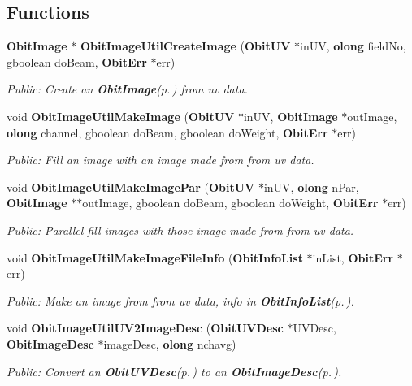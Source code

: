 \subsection*{Functions}
\begin{CompactItemize}
\item 
{\bf Obit\-Image} $\ast$ {\bf Obit\-Image\-Util\-Create\-Image} ({\bf Obit\-UV} $\ast$in\-UV, {\bf olong} field\-No, gboolean do\-Beam, {\bf Obit\-Err} $\ast$err)
\begin{CompactList}\small\item\em Public: Create an {\bf Obit\-Image}{\rm (p.\,\pageref{structObitImage})} from uv data. \item\end{CompactList}\item 
void {\bf Obit\-Image\-Util\-Make\-Image} ({\bf Obit\-UV} $\ast$in\-UV, {\bf Obit\-Image} $\ast$out\-Image, {\bf olong} channel, gboolean do\-Beam, gboolean do\-Weight, {\bf Obit\-Err} $\ast$err)
\begin{CompactList}\small\item\em Public: Fill an image with an image made from from uv data. \item\end{CompactList}\item 
void {\bf Obit\-Image\-Util\-Make\-Image\-Par} ({\bf Obit\-UV} $\ast$in\-UV, {\bf olong} n\-Par, {\bf Obit\-Image} $\ast$$\ast$out\-Image, gboolean do\-Beam, gboolean do\-Weight, {\bf Obit\-Err} $\ast$err)
\begin{CompactList}\small\item\em Public: Parallel fill images with those image made from from uv data. \item\end{CompactList}\item 
void {\bf Obit\-Image\-Util\-Make\-Image\-File\-Info} ({\bf Obit\-Info\-List} $\ast$in\-List, {\bf Obit\-Err} $\ast$err)
\begin{CompactList}\small\item\em Public: Make an image from from uv data, info in {\bf Obit\-Info\-List}{\rm (p.\,\pageref{structObitInfoList})}. \item\end{CompactList}\item 
void {\bf Obit\-Image\-Util\-UV2Image\-Desc} ({\bf Obit\-UVDesc} $\ast$UVDesc, {\bf Obit\-Image\-Desc} $\ast$image\-Desc, {\bf olong} nchavg)
\begin{CompactList}\small\item\em Public: Convert an {\bf Obit\-UVDesc}{\rm (p.\,\pageref{structObitUVDesc})} to an {\bf Obit\-Image\-Desc}{\rm (p.\,\pageref{structObitImageDesc})}. \item\end{CompactList}\item 
$$
\end{CompactItemize}
